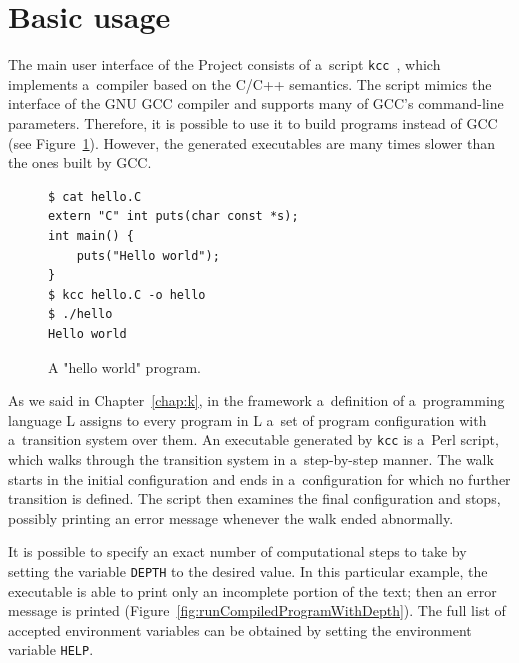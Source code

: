 \documentclass[nolot,nolof,nocover,printed]{fithesis3}
\newcommand{\kcc}{\texttt{kcc}\xspace}
\begin{document}

\section{Basic usage}

The main user interface of the Project consists of a~script \kcc~\cite{hathhorn-ellison-rosu-2015-pldi}, which implements a~compiler based on the C/C++ semantics. The script mimics the interface of the GNU GCC compiler and supports many of GCC's command-line parameters. Therefore, it is possible to use it to build programs instead of GCC (see Figure~\ref{helloWorldSource}). However, the generated executables are many times slower than the ones built by GCC.

\begin{figure}[ht]
\begin{lstlisting}
$ cat hello.C
extern "C" int puts(char const *s);
int main() {
	puts("Hello world");
}
$ kcc hello.C -o hello
$ ./hello
Hello world
\end{lstlisting}
\caption{A "hello world" program.}
\label{helloWorldSource}
\end{figure}

As we said in Chapter~\ref{chap:k}, in the \K framework a~definition of a~programming language L assigns to every program in L a~set of program configuration with a~transition system over them. An executable generated by \kcc is a~Perl script, which walks through the transition system in a~step-by-step manner. The walk starts in the initial configuration and ends in a~configuration for which no further transition is defined. The script then examines the final configuration and stops, possibly printing an error message whenever the walk ended abnormally.

It is possible to specify an exact number of computational steps to take by setting the variable \lstinline|DEPTH| to the desired value. In this particular example, the executable is able to print only an incomplete portion of the text; then an error message is printed (Figure~\ref{fig:runCompiledProgramWithDepth}). The full list of accepted environment variables can be obtained by setting the environment variable \lstinline|HELP|.
\end{document}
